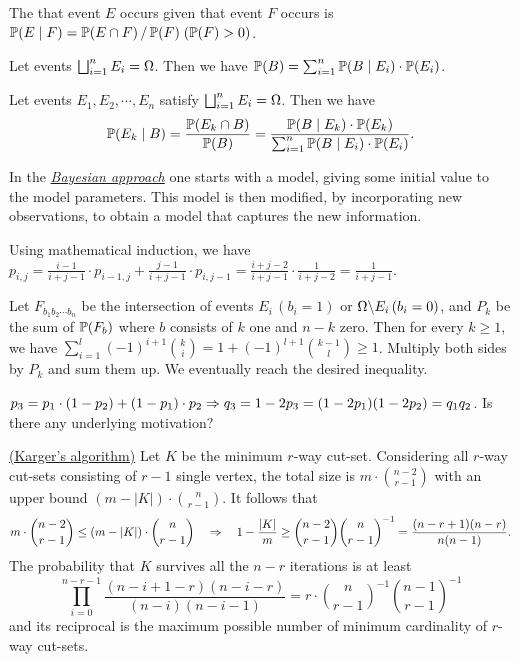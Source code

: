\documentclass[main.tex]{subfiles}
\begin{document}
The  that event $E$ occurs given that event $F$ occurs is $\mathbb{P}(E \mid F) = \mathbb{P}(E \cap F) \,/\, \mathbb{P}(F)\;(\mathbb{P}(F) > 0)$.

\begin{theorem}
	Let events $\bigsqcup_{i=1}^{n} E_i = \Omega$. Then we have $\mathbb{P}(B) = \sum_{i=1}^{n} \mathbb{P}(B \mid E_i)\cdot \mathbb{P}(E_i)$. 
\end{theorem}

\begin{theorem}
	Let events $E_1,E_2,\cdots,E_n$ satisfy $\bigsqcup_{i=1}^{n} E_i = \Omega$. Then we have
	\[
		\mathbb{P}(E_k \mid B) = \frac{\mathbb{P}(E_k \cap B)}{\mathbb{P}(B)}
		= \frac{\mathbb{P}(B \mid E_k)\cdot \mathbb{P}(E_k)}{\sum_{i=1}^{n}\mathbb{P}(B \mid E_i) \cdot \mathbb{P}(E_i)}.
	\] 
\end{theorem}

In the \href{https://en.wikipedia.org/wiki/Bayesian_inference}{\it Bayesian approach} one starts with a  model, giving some initial value to the model parameters. This model is then modified, by incorporating new observations, to obtain a  model that captures the new information.

\bigskip

Using mathematical induction, we have $p_{i,j} = \frac{i-1}{i+j-1}\cdot p_{i-1,j} + \frac{j-1}{i+j-1}\cdot p_{i,j-1} = \frac{i+j-2}{i+j-1}\cdot\frac{1}{i+j-2} = \frac{1}{i+j-1}$.

Let $F_{b_1b_2\cdots b_n}$ be the intersection of events $E_i\,(b_i=1)$ or $\Omega\backslash E_i\,(b_i=0)$, and $P_{k}$ be the sum of $\mathbb{P}(F_b)$ where $b$ consists of $k$ one and $n-k$ zero. Then for every $k \ge 1$, we have $\sum_{i=1}^{l}(-1)^{i+1}\binom{k}{i} = 1 + (-1)^{l+1}\binom{k-1}{l} \ge 1$. Multiply both sides by $P_k$ and sum them up. We eventually reach the desired inequality.

$p_3 = p_1\cdot (1-p_2) + (1-p_1) \cdot p_2 \Rightarrow q_3 = 1-2p_3 = (1-2p_1)(1-2p_2) = q_1q_2$. Is there any underlying motivation?

 \href{https://en.wikipedia.org/wiki/Karger's_algorithm}{(Karger's algorithm)} Let $K$ be the minimum $r$-way cut-set. Considering all $r$-way cut-sets consisting of $r-1$ single vertex, the total size is $m\cdot \binom{n-2}{r-1}$ with an upper bound $(m-|K|)\cdot \binom{n}{r-1}$. It follows that
	\[
	m \cdot \binom{n-2}{r-1} \le (m-|K|)\cdot \binom{n}{r-1} \quad\Rightarrow\quad 1-\frac {|K|}{m} \ge \binom{n-2}{r-1}\binom n{r-1}^{-1}=\frac{(n-r+1)(n-r)}{n(n-1)}.
	\]
The probability that $K$ survives all the $n-r$ iterations is at least
	\[
		\prod_{i=0}^{n-r-1}\frac{(n-i+1-r)(n-i-r)}{(n-i)(n-i-1)} = r\cdot \binom{n}{r-1}^{-1}\binom{n-1}{r-1}^{-1}
	\]
and its reciprocal is the maximum possible number of minimum cardinality of $r$-way cut-sets.
\end{document}
